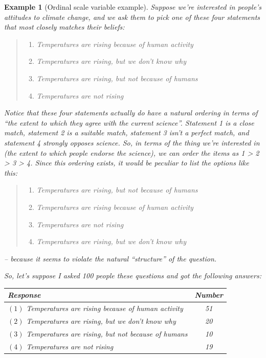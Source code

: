 \documentclass[
  11pt,
]{book}
\providecommand{\tightlist}{%
  \setlength{\itemsep}{0pt}\setlength{\parskip}{0pt}}
\theoremstyle{indenteddefinition}
\theoremstyle{indenteddefinition}
\newtheorem{example}{Example}[chapter]
\theoremstyle{definition}
\theoremstyle{definition}
\theoremstyle{remark}
\begin{document}
\begin{example}[Ordinal scale variable example]
\protect\hypertarget{exm:exordinal}{}\label{exm:exordinal}Suppose we're interested in people's attitudes to climate change, and we ask them to pick one of these four statements that most closely matches their beliefs:

\begin{quote}
\begin{enumerate}
\def\labelenumi{(\arabic{enumi})}
\tightlist
\item
  Temperatures are rising because of human activity
\item
  Temperatures are rising, but we don't know why
\item
  Temperatures are rising, but not because of humans
\item
  Temperatures are not rising
\end{enumerate}
\end{quote}

Notice that these four statements actually do have a natural ordering in terms of ``the extent to which they agree with the current science''. Statement 1 is a close match, statement 2 is a suitable match, statement 3 isn't a perfect match, and statement 4 strongly opposes science. So, in terms of the thing we're interested in (the extent to which people endorse the science), we can order the items as 1 \textgreater{} 2 \textgreater{} 3 \textgreater{} 4. Since this ordering exists, it would be peculiar to list the options like this:

\begin{quote}
\begin{enumerate}
\def\labelenumi{(\arabic{enumi})}
\setcounter{enumi}{2}
\tightlist
\item
  Temperatures are rising, but not because of humans
\item
  Temperatures are rising because of human activity
\item
  Temperatures are not rising
\item
  Temperatures are rising, but we don't know why
\end{enumerate}
\end{quote}

-- because it seems to violate the natural ``structure'' of the question.

So, let's suppose I asked 100 people these questions and got the following answers:

\begin{table}[H]
\centering
\begin{tabular}{lc}
\toprule
Response & Number\\
\midrule
$(1)$ Temperatures are rising because of human activity & 51\\
$(2)$ Temperatures are rising, but we don't know why & 20\\
$(3)$ Temperatures are rising, but not because of humans & 10\\
$(4)$ Temperatures are not rising & 19\\
\bottomrule
\end{tabular}
\end{table}


\end{example}
\end{document}
